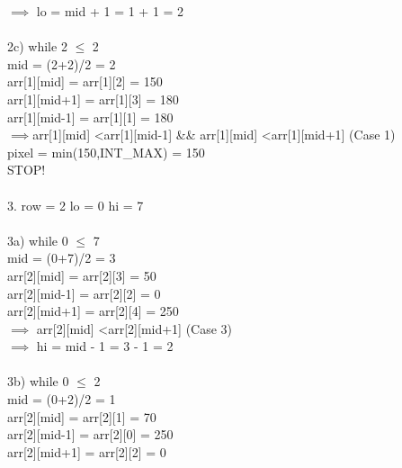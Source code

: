 \documentclass[10pt]{article}
\begin{document}
\begin{multicols*}{2}
        $\implies$ lo = mid + 1 = 1 + 1 = 2\\\\2c) while 2 $\leq$ 2\\
    
        mid = (2+2)/2 = 2\\

        arr[1][mid] = arr[1][2] = 150\\

        arr[1][mid+1] = arr[1][3] = 180\\
        
        arr[1][mid-1] = arr[1][1] = 180\\
        
        $\implies$arr[1][mid] \textless  arr[1][mid-1] \&\& arr[1][mid] \textless arr[1][mid+1] (Case 1)\\
    
        pixel = min(150,INT\_MAX) = 150\\
        
        STOP!\\\\3. row = 2 lo = 0 hi = 7\\\\3a) while 0 $\leq$ 7\\

        mid = (0+7)/2 = 3\\

        arr[2][mid] = arr[2][3] = 50\\

        arr[2][mid-1] = arr[2][2] = 0\\

        arr[2][mid+1] = arr[2][4] = 250\\
        
        $\implies$ arr[2][mid] \textless arr[2][mid+1] (Case 3)\\
        
        $\implies$ hi = mid - 1 = 3 - 1 = 2\\\\3b) while 0 $\leq$ 2\\
    
        mid = (0+2)/2 = 1\\

        arr[2][mid] = arr[2][1] = 70\\

        arr[2][mid-1] = arr[2][0] = 250\\

        arr[2][mid+1] = arr[2][2] = 0\\
        

\end{multicols*}
\end{document}
